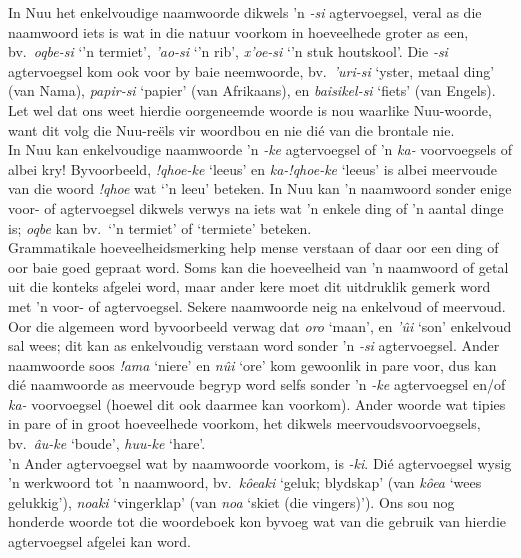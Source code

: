 In N\textipa{\textvertline}uu het enkelvoudige naamwoorde dikwels 'n
\emph{-si} agtervoegsel, veral as die naamwoord iets is wat in die
natuur voorkom in hoeveelhede groter as een, bv.\
\emph{\textipa{\textdoublevertline}oqbe-si} `'n termiet',
\emph{\textipa{\textdoublebarpipe}'ao-si} `'n rib',
\emph{\textipa{\textdoublevertline}x'oe-si} `'n stuk houtskool'. Die
\emph{-si} agtervoegsel kom ook voor by baie neemwoorde, bv.\
\emph{\textipa{\textvertline}'uri-si} `yster, metaal ding' (van Nama),
\emph{papir-si} `papier' (van Afrikaans), en \emph{baisikel-si}
`fiets' (van Engels). Let wel dat ons weet hierdie oorgeneemde woorde
is nou waarlike N\textipa{\textvertline}uu-woorde, want dit volg die
N\textipa{\textvertline}uu-re\"{e}ls vir woordbou en nie di\'{e} van
die brontale nie.\\

In N\textipa{\textvertline}uu kan enkelvoudige naamwoorde 'n
\emph{-ke} agtervoegsel of 'n \emph{ka-} voorvoegsels of albei kry!
Byvoorbeeld, \emph{!qhoe-ke} `leeus' en \emph{ka-!qhoe-ke} `leeus' is
albei meervoude van die woord \emph{!qhoe} wat `'n leeu' beteken. In
N\textipa{\textvertline}uu kan 'n naamwoord sonder enige voor- of
agtervoegsel dikwels verwys na iets wat 'n enkele ding of 'n aantal
dinge is; \emph{\textipa{\textdoublevertline}oqbe} kan bv.\ `'n
termiet' of `termiete' beteken.\\

Grammatikale hoeveelheidsmerking help mense verstaan of daar oor een
ding of oor baie goed gepraat word. Soms kan die hoeveelheid van 'n
naamwoord of getal uit die konteks afgelei word, maar ander kere moet
dit uitdruklik gemerk word met 'n voor- of agtervoegsel. Sekere
naamwoorde neig na enkelvoud of meervoud. Oor die algemeen word
byvoorbeeld verwag dat \emph{\textipa{\textdoublebarpipe}oro} `maan',
en \emph{\textipa{\textdoublevertline}'\^{u}i} `son' enkelvoud sal
wees; dit kan as enkelvoudig verstaan word sonder 'n \emph{-si}
agtervoegsel. Ander naamwoorde soos \emph{!ama} `niere' en
\emph{n\textipa{\textdoublebarpipe}\^{u}i} `ore' kom gewoonlik in pare
voor, dus kan di\'{e} naamwoorde as meervoude begryp word selfs sonder
'n \emph{-ke} agtervoegsel en/of \emph{ka-} voorvoegsel (hoewel dit
ook daarmee kan voorkom). Ander woorde wat tipies in pare of in groot
hoeveelhede voorkom, het dikwels meervoudsvoorvoegsels, bv.\
\emph{\textipa{\textdoublebarpipe}\^{a}u-ke} `boude',
\emph{\textipa{\textvertline}huu-ke} `hare'.\\

'n Ander agtervoegsel wat by naamwoorde voorkom, is \emph{-ki}.
Di\'{e} agtervoegsel wysig 'n werkwoord tot 'n naamwoord, bv.\
\emph{k\^{o}eaki} `geluk; blydskap' (van \emph{k\^{o}ea} `wees
gelukkig'), \emph{n\textipa{\textdoublebarpipe}oaki} `vingerklap' (van
\emph{n\textipa{\textdoublebarpipe}oa} `skiet (die vingers)'). Ons sou
nog honderde woorde tot die woordeboek kon byvoeg wat van die gebruik
van hierdie agtervoegsel afgelei kan word.\\

